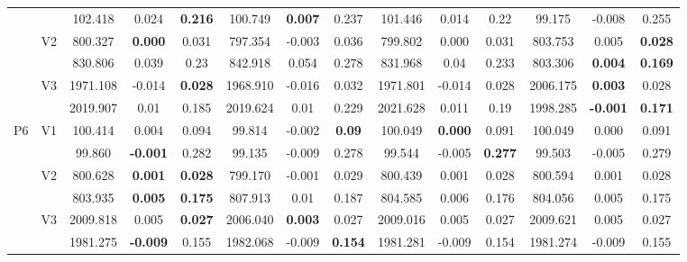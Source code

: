 \documentclass[12pt,a4paper]{article}
\begin{document}
\begin{sidewaystable}[ht]
{\begin{tabular}{cc|ccc|ccc|ccc|ccc|}
   &  & 102.418 & 0.024 & \textbf{0.216} & 100.749 & \textbf{0.007} & 0.237 & 101.446 & 0.014 & 0.22 & 99.175 & -0.008 & 0.255 \\ 
   & \multirow{2}{*}{V2} & 800.327 & \textbf{0.000} & 0.031 & 797.354 & -0.003 & 0.036 & 799.802 & 0.000 & 0.031 & 803.753 & 0.005 & \textbf{0.028} \\ 
   &  & 830.806 & 0.039 & 0.23 & 842.918 & 0.054 & 0.278 & 831.968 & 0.04 & 0.233 & 803.306 & \textbf{0.004} & \textbf{0.169} \\ 
   & \multirow{2}{*}{V3} & 1971.108 & -0.014 & \textbf{0.028} & 1968.910 & -0.016 & 0.032 & 1971.801 & -0.014 & 0.028 & 2006.175 & \textbf{0.003} & 0.028 \\ 
   &  & 2019.907 & 0.01 & 0.185 & 2019.624 & 0.01 & 0.229 & 2021.628 & 0.011 & 0.19 & 1998.285 & \textbf{-0.001} & \textbf{0.171} \\ 
   \hline \hline\multirow{6}{*}{P6} & \multirow{2}{*}{V1} & 100.414 & 0.004 & 0.094 & 99.814 & -0.002 & \textbf{0.09} & 100.049 & \textbf{0.000} & 0.091 & 100.049 & 0.000 & 0.091 \\ 
   &  & 99.860 & \textbf{-0.001} & 0.282 & 99.135 & -0.009 & 0.278 & 99.544 & -0.005 & \textbf{0.277} & 99.503 & -0.005 & 0.279 \\ 
   & \multirow{2}{*}{V2} & 800.628 & \textbf{0.001} & \textbf{0.028} & 799.170 & -0.001 & 0.029 & 800.439 & 0.001 & 0.028 & 800.594 & 0.001 & 0.028 \\ 
   &  & 803.935 & \textbf{0.005} & \textbf{0.175} & 807.913 & 0.01 & 0.187 & 804.585 & 0.006 & 0.176 & 804.056 & 0.005 & 0.175 \\ 
   & \multirow{2}{*}{V3} & 2009.818 & 0.005 & \textbf{0.027} & 2006.040 & \textbf{0.003} & 0.027 & 2009.016 & 0.005 & 0.027 & 2009.621 & 0.005 & 0.027 \\ 
   &  & 1981.275 & \textbf{-0.009} & 0.155 & 1982.068 & -0.009 & \textbf{0.154} & 1981.281 & -0.009 & 0.154 & 1981.274 & -0.009 & 0.155 \\ 
   \hline
\end{tabular}
}
\end{sidewaystable}
\end{document}
